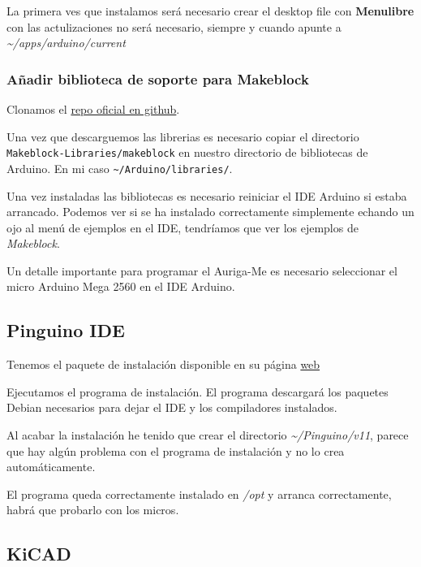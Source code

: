 \documentclass[12pt,spanish,]{scrartcl}
\begin{document}
La primera ves que instalamos será necesario crear el desktop file con
\textbf{Menulibre} con las actulizaciones no será necesario, siempre y
cuando apunte a \emph{\textasciitilde{}/apps/arduino/current}

\subsubsection{Añadir biblioteca de soporte para
Makeblock}\label{auxf1adir-biblioteca-de-soporte-para-makeblock}

Clonamos el
\href{https://github.com/Makeblock-official/Makeblock-Libraries}{repo
oficial en github}.

Una vez que descarguemos las librerias es necesario copiar el directorio
\texttt{Makeblock-Libraries/makeblock} en nuestro directorio de
bibliotecas de Arduino. En mi caso
\texttt{\textasciitilde{}/Arduino/libraries/}.

Una vez instaladas las bibliotecas es necesario reiniciar el IDE Arduino
si estaba arrancado. Podemos ver si se ha instalado correctamente
simplemente echando un ojo al menú de ejemplos en el IDE, tendríamos que
ver los ejemplos de \emph{Makeblock}.

Un detalle importante para programar el Auriga-Me es necesario
seleccionar el micro Arduino Mega 2560 en el IDE Arduino.

\subsection{Pinguino IDE}\label{pinguino-ide}

Tenemos el paquete de instalación disponible en su página
\href{http://pinguino.cc/download.php}{web}

Ejecutamos el programa de instalación. El programa descargará los
paquetes Debian necesarios para dejar el IDE y los compiladores
instalados.

Al acabar la instalación he tenido que crear el directorio
\emph{\textasciitilde{}/Pinguino/v11}, parece que hay algún problema con
el programa de instalación y no lo crea automáticamente.

El programa queda correctamente instalado en \emph{/opt} y arranca
correctamente, habrá que probarlo con los micros.

\subsection{KiCAD}\label{kicad}
\end{document}

